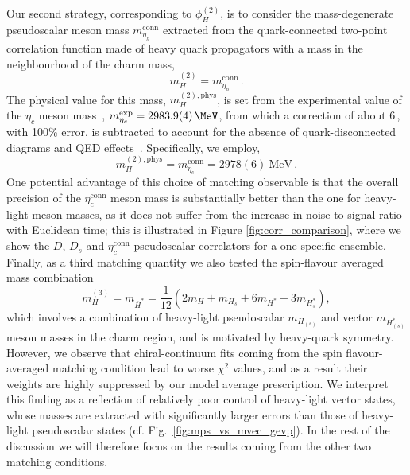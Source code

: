 Our second strategy, corresponding to $\phi_H^{(2)}$, is to
consider the mass-degenerate pseudoscalar meson mass $m_{\eta_h}^{\mathrm{conn}}$ extracted from
the quark-connected two-point correlation function made of heavy quark
propagators with a mass in the neighbourhood of the charm mass,
%
\begin{equation}
  m_H^{(2)} = m_{\eta_h}^{\mathrm{conn}}\,.
                  \label{eq:etac_matching}
\end{equation}
%
The physical value for this mass, $m_H^{(2), \mathrm{phys}}$,  is set from the experimental
value of the $\eta_c$ meson mass~\cite{ParticleDataGroup:2022pth},
$m_{\eta_c}^{\mathrm{exp}} = 2983.9(4)\,\MeV$, from which a
correction of about 6\,\MeV, with 100\% error, is subtracted to account
for the absence of quark-disconnected diagrams and QED effects~\cite{deForcrand:2004ia, Donald:2012ga,Colquhoun:2015oha,Hatton:2020qhk,Colquhoun:2023zbc}. Specifically, we employ, 
%
\begin{equation}
  m_H^{(2), \mathrm{phys}} = m_{\eta_c}^{\mathrm{conn}} = 2978(6) \ \mathrm{MeV}\,.
\end{equation}
%
One potential advantage of this choice of matching observable is that
the overall precision of the $\eta_c^{\mathrm{conn}}$ meson mass is substantially better than the one
for heavy-light meson masses, as it does not suffer from the increase in noise-to-signal
ratio with Euclidean time; this is illustrated in Figure \ref{fig:corr_comparison},
where we show the $D$, $D_s$ and $\eta_c^{\mathrm{conn}}$ pseudoscalar correlators for a one specific ensemble.
%
Finally, as a third matching quantity we also tested the spin-flavour averaged mass combination
 \begin{equation}
 	m_H^{(3)} = m_{\overline{H}^*} = \frac{1}{12} \left(
 	2m_H + m_{H_s} + 6 m_{H^*} + 3 m_{H_s^*}
 	\right),
 	\label{eq:spin_flavour_av}
 \end{equation}
which involves a combination of heavy-light pseudoscalar  $m_{H_{(s)}}$ and vector  $m_{H_{(s)}^*}$ meson masses in the charm region, and
is motivated by heavy-quark symmetry. However, we observe that chiral-continuum fits coming from the spin flavour-averaged matching condition
lead to worse $\chi^2$ values, and as a result their weights are highly suppressed by  our model average prescription. We interpret this finding as a reflection of relatively poor control of heavy-light vector states, whose masses are extracted with significantly larger errors than those of heavy-light pseudoscalar states (cf. Fig.~\ref{fig:mps_vs_mvec_gevp}). In the rest of the discussion we will therefore focus on the results coming from the other two matching conditions.
%


